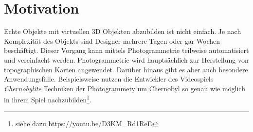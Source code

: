 
\chapter{Motivation}
Echte Objekte mit virtuellen 3D Objekten abzubilden ist nicht einfach. Je nach Komplexität des Objekts sind Designer mehrere Tagen oder gar Wochen beschäftigt.
Dieser Vorgang kann mittels Photogrammetrie teilweise automatisiert und vereinfacht werden.
Photogrammetrie wird hauptsächlich zur Herstellung von topographischen Karten angewendet\cite{kraus_2004}.
Darüber hinaus gibt es aber auch besondere Anwendungsfälle.
Beispielsweise nutzen die Entwickler des Videospiels \emph{Chernobylite} Techniken der Photogrammety um Chernobyl so genau wie möglich in ihrem Spiel nachzubilden\footnote{siehe dazu https://youtu.be/D3KM\_Rd1ReE}.